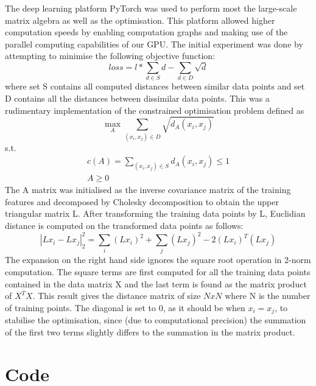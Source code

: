 \documentclass[10pt,technote]{IEEEtran}
\begin{document}
The deep learning platform PyTorch was used to perform most the large-scale matrix algebra as well as the optimisation. This platform allowed higher computation speeds by enabling computation graphs and making use of the parallel computing capabilities of our GPU.
The initial experiment was done by attempting to minimise the following objective function: \begin{equation}
    loss = l*\sum_{d \in S}d -  \sum_{d \in D}\sqrt{d}
\end{equation}
where set S contains all computed distances between similar data points and set D contains all the distances between dissimilar data points. This was a rudimentary implementation of the constrained optimisation problem defined as
\begin{equation}
    \max_{A}\sum_{(x_i, x_j) \in D}\sqrt{d_A (x_i, x_j)}
\end{equation}
s.t.
\begin{equation}
    \begin{aligned}
        c(A) = \sum_{(x_i, x_j) \in S}d_A (x_i, x_j) \le 1 \\
        A \ge 0
    \end{aligned}
\end{equation}
The A matrix was initialised as the 
inverse covariance matrix of the training features and decomposed by Cholesky decomposition to obtain the upper triangular matrix L. After transforming the training data points by L, Euclidian distance is computed on the transformed data points as follows:
\begin{equation}
    |Lx_i - Lx_j|_2^2 = \sum_{i}(Lx_i)^2 + \sum_{j}(Lx_j)^2 - 2(Lx_i)^T(Lx_j)
\end{equation}
The expansion on the right hand side ignores the square root operation in 2-norm computation. The square terms are first computed for all the training data points contained in the data matrix X and the last term is found as the matrix product of $X^TX$. This result gives the distance matrix of size $NxN$ where N is the number of training points. The diagonal is set to 0, as it should be when $x_i = x_j$, to stabilise the optimisation, since (due to computational precision) the summation of the first two terms slightly differs to the summation in the matrix product. 

\section{Code}
\end{document}
